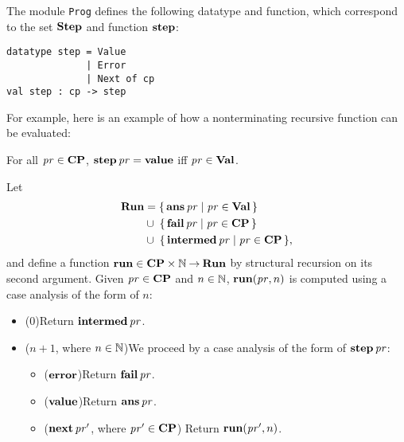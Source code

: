 The module \texttt{Prog} defines the following datatype and function,
which correspond to the set $\mathbf{Step}$ and function $\mathbf{step}$:
\begin{verbatim}
datatype step = Value
              | Error
              | Next of cp
val step : cp -> step
\end{verbatim}
%
%
%
%
For example, here is an example of how a nonterminating recursive
function can be evaluated:


\begin{proposition}
For all $\mathit{pr}\in\mathbf{CP}$, $\mathbf{step}\,\mathit{pr} = \mathbf{value}$ iff $\mathit{pr}\in\mathbf{Val}$.
\end{proposition}

Let
%
%
%
%
%
\begin{align*}
  \mathbf{Run} &= \{ \, \mathbf{ans}\,\mathit{pr} \mid \mathit{pr}\in\mathbf{Val} \, \} \\
  &\cup \;\{ \, \mathbf{fail}\,\mathit{pr} \mid \mathit{pr}\in\mathbf{CP} \, \} \\
  &\cup \;\{ \, \mathbf{intermed}\,\mathit{pr} \mid \mathit{pr}\in\mathbf{CP} \, \} ,
\end{align*}
and define a function $\mathbf{run}\in\mathbf{CP}\times\mathbb{N}\mathbin{\to}\mathbf{Run}$ by
structural recursion on its second argument.  Given $\mathit{pr}\in\mathbf{CP}$ and
$n\in\mathbb{N}$, $\mathbf{run}(\mathit{pr},n)$ is computed using a case analysis of
the form of $n$:
\begin{itemize}
\item ($0$)\quad Return $\mathbf{intermed}\,\mathit{pr}$.

\item ($n + 1$, where $n\in\mathbb{N}$)\quad We proceed by a case analysis
  of the form of $\mathbf{step}\,\mathit{pr}$:
  \begin{itemize}
  \item ($\mathbf{error}$)\quad Return $\mathbf{fail}\,\mathit{pr}$.

  \item ($\mathbf{value}$)\quad Return $\mathbf{ans}\,\mathit{pr}$.

  \item ($\mathbf{next}\,\mathit{pr}'$, where $\mathit{pr}'\in\mathbf{CP}$)\quad
    Return $\mathbf{run}(\mathit{pr}', n)$.
  \end{itemize}
\end{itemize}

